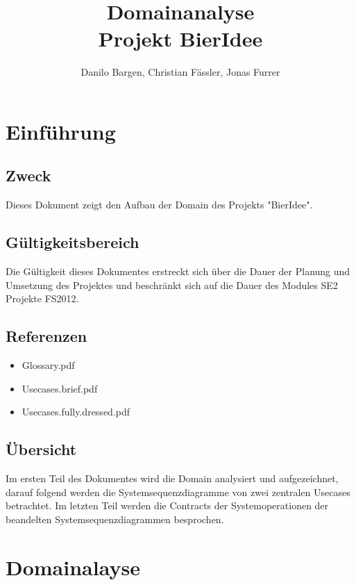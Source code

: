 \documentclass[10pt,a4paper]{scrartcl}
\author{Danilo Bargen, Christian Fässler, Jonas Furrer}
\title{Domainanalyse\\Projekt BierIdee}
\begin{document}
\begin{titlepage}
	\maketitle
	\vspace{120mm}
	\thispagestyle{empty} %
\end{titlepage}

\tableofcontents
\newpage

\section{Einführung}
\subsection{Zweck}
Dieses Dokument zeigt den Aufbau der Domain des Projekts "BierIdee".
\subsection{Gültigkeitsbereich}
Die Gültigkeit dieses Dokumentes erstreckt sich über die Dauer der Planung und Umsetzung des Projektes und beschränkt sich auf die Dauer des Modules SE2 Projekte FS2012.
\subsection{Referenzen}
\begin{itemize}
	\item Glossary.pdf
	\item Usecases.brief.pdf
	\item Usecases.fully.dressed.pdf
\end{itemize}
\subsection{Übersicht}
Im ersten Teil des Dokumentes wird die Domain analysiert und aufgezeichnet, darauf folgend werden die Systemsequenzdiagramme von zwei zentralen Usecases betrachtet. Im letzten Teil werden die Contracts der Systemoperationen der beandelten Systemsequenzdiagrammen besprochen.

\section{Domainalayse}
\end{document}
